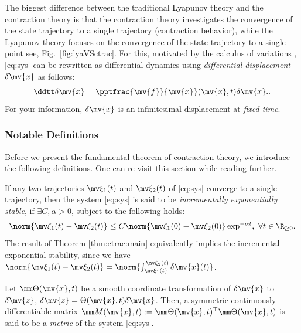 \documentclass{article}
\newcommand*{\bdx}{\mv{x}} %
\newcommand*{\bdz}{\mv{z}} %
\newcommand*{\bdf}{\mv{f}} %
\newcommand*{\tpfpx}{\pptfrac{\bdf}{\bdx}} %
\begin{document}
The biggest difference between the traditional Lyapunov theory and the contraction theory is that the contraction theory investigates the convergence of the state trajectory to a single trajectory (contraction behavior), while the Lyapunov theory focuses on the convergence of the state trajectory to a single point \ie see, Fig.~\ref{fig:lyaVSctrac}.
For this, motivated by the calculus of variations \cite[Chap. 4]{Kirk:2004aa}, \eqref{eq:sys} can be rewritten as differential dynamics using \textit{differential displacement} $\delta\bdx$ as follows:
\begin{equation}
    \ddtt\delta\bdx
    =
    \tpfpx(\bdx,t)
    \delta\bdx.
    .
    \label{eq:diff_sys}
\end{equation}
For your information, $\delta\bdx$ is an infinitesimal displacement at \textit{fixed time}.

\subsubsection{Notable Definitions}

Before we present the fundamental theorem of contraction theory, we introduce the following definitions.
One can re-visit this section while reading further.

\begin{definition}  
    If any two trajectories $\mv\xi_1(t)$ and $\mv\xi_2(t)$ of \eqref{eq:sys} converge to a single trajectory, then the system \eqref{eq:sys} is said to be \textit{incrementally exponentially stable}, if $\exists C,\alpha>0$, subject to the following holds:
    \begin{equation}      
        \norm{\mv\xi_1(t)-\mv\xi_2(t)}
        \le 
        C
        \norm{\mv\xi_1(0)-\mv\xi_2(0)}
        \exp^{-\alpha t}
        ,\ \forall t\in\R_{\ge 0}
        .
    \end{equation}
    The result of Theorem \ref{thm:ctrac:main} equivalently implies the incremental exponential stability, since we have $\norm{\mv\xi_1(t)-\mv\xi_2(t)}= \norm{\int_{\mv\xi_1(t)}^{\mv\xi_2(t)}\delta\bdx(t)}$.
    \label{def:inc_exp_stable}
\end{definition}

\begin{definition}
    Let $\mm\Theta(\bdx,t)$ be a smooth coordinate transformation of $\delta\bdx$ to $\delta\bdz$, \ie $\delta\bdz = \Theta(\bdx,t)\delta\bdx$.
    Then, a symmetric continuously differentiable matrix $\mm M(\bdx,t):=\mm\Theta(\bdx,t)^\top\mm\Theta(\bdx,t)$ is said to be a \textit{metric} of the system \eqref{eq:sys}.
    \label{def:metric}
\end{definition}
\end{document}

